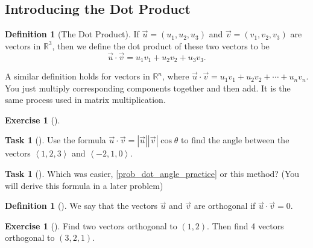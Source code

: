 \documentclass[10pt,]{book}
\theoremstyle{plain}
\theoremstyle{definition}
\newtheorem{definition}[theorem]{Definition}
\theoremstyle{definition}
\theoremstyle{definition}
\theoremstyle{definition}
\newtheorem{exploration}[project]{Exercise}
\newtheorem{task}[project]{Task}
\theoremstyle{definition}
\numberwithin{equation}{section}
\newcommand{\lt}{<}
\begin{document}
\subsection[{Introducing the Dot Product}]{Introducing the Dot Product}\label{subsection-8}
\begin{definition}[{The Dot Product}]\label{dot_def}
If \(\vec u = (u_1,u_2,u_3)\) and \(\vec v= (v_1,v_2,v_3)\) are vectors in \(\mathbb{R}^3\), then we define the dot product of these two vectors to be%
\begin{equation*}
\vec u\cdot \vec v = u_1 v_1+ u_2 v_2+ u_3 v_3.
\end{equation*}
%
\par
A similar definition holds for vectors in \(\mathbb{R}^n\), where \(\vec u\cdot \vec v = u_1 v_1+ u_2 v_2+\cdots+ u_n v_n.\) You just multiply corresponding components together and then add. It is the same process used in matrix multiplication.%
\end{definition}
\begin{exploration}[]\label{prob_dot_angle_practice2}
\begin{task}[]\label{task-60}
Use the formula \(\vec u\cdot \vec v=|\vec u||\vec v|\cos\theta\) to find the angle between the vectors \(\left\lt 1,2,3\right>\) and \(\left\lt -2,1,0\right>\).%
\end{task}
\begin{task}[]\label{task-61}
Which was easier, \hyperref[prob_dot_angle_practice]{\ref{prob_dot_angle_practice}} or this method?  (You will derive this formula in a later problem)%
\end{task}
\end{exploration}
\begin{definition}[{}]\label{def_orthogonal}
We say that the vectors \(\vec u\) and \(\vec v\) are orthogonal if \(\vec u\cdot \vec v=0\).%
\end{definition}
\begin{exploration}[]\label{exploration-32}
Find two vectors orthogonal to \((1,2)\). Then find 4 vectors orthogonal to \((3,2,1)\).%
\end{exploration}
\typeout{************************************************}
\typeout{************************************************}
\end{document}
